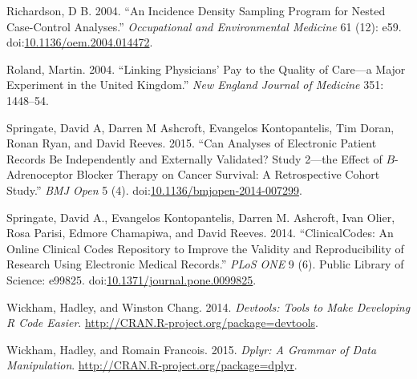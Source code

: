 \documentclass[]{article}
\begin{document}
Richardson, D B. 2004. ``An Incidence Density Sampling Program for
Nested Case-Control Analyses.'' \emph{Occupational and Environmental
Medicine} 61 (12): e59.
doi:\href{http://dx.doi.org/10.1136/oem.2004.014472}{10.1136/oem.2004.014472}.

Roland, Martin. 2004. ``Linking Physicians' Pay to the Quality of
Care---a Major Experiment in the United Kingdom.'' \emph{New England
Journal of Medicine} 351: 1448--54.

Springate, David A, Darren M Ashcroft, Evangelos Kontopantelis, Tim
Doran, Ronan Ryan, and David Reeves. 2015. ``Can Analyses of Electronic
Patient Records Be Independently and Externally Validated? Study 2---the
Effect of \(B\)-Adrenoceptor Blocker Therapy on Cancer Survival: A
Retrospective Cohort Study.'' \emph{BMJ Open} 5 (4).
doi:\href{http://dx.doi.org/10.1136/bmjopen-2014-007299}{10.1136/bmjopen-2014-007299}.

Springate, David A., Evangelos Kontopantelis, Darren M. Ashcroft, Ivan
Olier, Rosa Parisi, Edmore Chamapiwa, and David Reeves. 2014.
``ClinicalCodes: An Online Clinical Codes Repository to Improve the
Validity and Reproducibility of Research Using Electronic Medical
Records.'' \emph{PLoS ONE} 9 (6). Public Library of Science: e99825.
doi:\href{http://dx.doi.org/10.1371/journal.pone.0099825}{10.1371/journal.pone.0099825}.

Wickham, Hadley, and Winston Chang. 2014. \emph{Devtools: Tools to Make
Developing R Code Easier}.
\url{http://CRAN.R-project.org/package=devtools}.

Wickham, Hadley, and Romain Francois. 2015. \emph{Dplyr: A Grammar of
Data Manipulation}. \url{http://CRAN.R-project.org/package=dplyr}.
\end{document}
